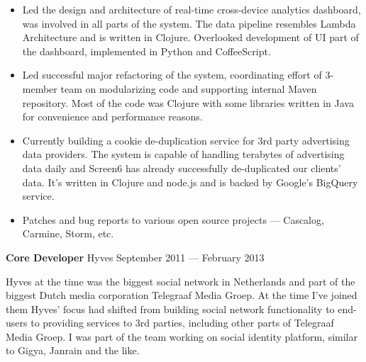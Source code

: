 \documentclass[margin]{res}
\begin{document}
\begin{resume}
\begin{itemize} \itemsep -1pt
\item Led the design and architecture of real-time cross-device
  analytics dashboard, was involved in all parts of the system. The
  data pipeline resembles Lambda Architecture and is written in
  Clojure. Overlooked development of UI part of the dashboard,
  implemented in Python and CoffeeScript.
\item Led successful major refactoring of the system, coordinating
  effort of 3-member team on modularizing code and supporting internal
  Maven repository. Most of the code was Clojure with some libraries
  written in Java for convenience and performance reasons.
\item Currently building a cookie de-duplication service for 3rd party
  advertising data providers. The system is capable of handling
  terabytes of advertising data daily and Screen6 has already
  successfully de-duplicated our clients' data. It's written in
  Clojure and node.js and is backed by Google's BigQuery service.
\item Patches and bug reports to various open source projects ---
  Cascalog, Carmine, Storm, etc.
\end{itemize}

{\bf Core Developer} Hyves \hfill September 2011 --- February 2013

Hyves at the time was the biggest social network in Netherlands and
part of the biggest Dutch media corporation Telegraaf Media Groep. At
the time I've joined them Hyves' focus had shifted from building
social network functionality to end-users to providing services to 3rd
parties, including other parts of Telegraaf Media Groep.  I was part of
the team working on social identity platform, similar to Gigya,
Janrain and the like.\\


\end{resume}
\end{document}
